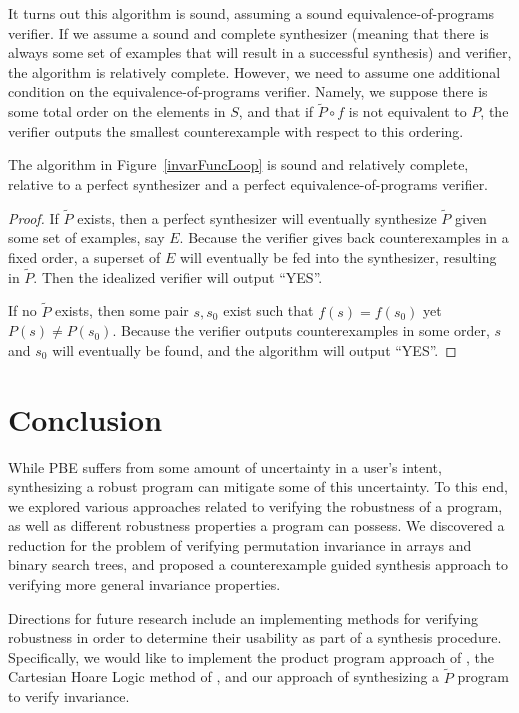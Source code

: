 \documentclass{llncs}
\begin{document}
  It turns out this algorithm is sound, assuming a sound equivalence-of-programs
  verifier.
  If we assume a sound and complete synthesizer (meaning that there is
  always some set of examples that will result in a successful synthesis)
  and verifier, the algorithm is relatively complete.
  However, we need to assume one additional condition on the
  equivalence-of-programs verifier.
  Namely, we suppose there is some total order on the elements in $S$,
  and that if $\widetilde{P}\circ f$ is not equivalent to $P$,
  the verifier outputs the smallest counterexample with respect to this
  ordering.

  \begin{theorem}
    The algorithm in Figure~\ref{invarFuncLoop} is sound and relatively complete,
    relative to a perfect synthesizer and a perfect equivalence-of-programs
    verifier.
  \end{theorem}
  \begin{proof}

    If $\widetilde{P}$ exists, then a perfect synthesizer will eventually
    synthesize $\widetilde{P}$ given some set of examples, say $E$.
    Because the verifier gives back counterexamples in a fixed order,
    a superset of $E$ will eventually be fed into the synthesizer,
    resulting in $\widetilde{P}$.
    Then the idealized verifier will output ``YES''.

    If no $\widetilde{P}$ exists, then some pair $s, s_0$ exist
    such that $f(s)=f(s_0)$ yet $P(s)\ne P(s_0)$.
    Because the verifier outputs counterexamples in some order,
    $s$ and $s_0$ will eventually be found, and the algorithm will output ``YES''.
  \end{proof}

\section{Conclusion}

While PBE suffers from some amount of uncertainty in a user's intent, synthesizing
a robust program can mitigate some of this uncertainty.  To this end, we explored
various approaches related to verifying the robustness of a program, as well as
different robustness properties a program can possess.  We discovered a reduction
for the problem of verifying permutation invariance in arrays and binary search trees,
and proposed a counterexample guided synthesis approach to verifying more general
invariance properties.

Directions for future research include an implementing methods for verifying robustness
in order to determine their usability as part of a synthesis procedure.  Specifically,
we would like to implement the product program approach of \cite{bartheproduct}, the
Cartesian Hoare Logic method of \cite{sousa16}, and our approach of synthesizing a
\(\widetilde{P}\) program to verify invariance.
\end{document}
